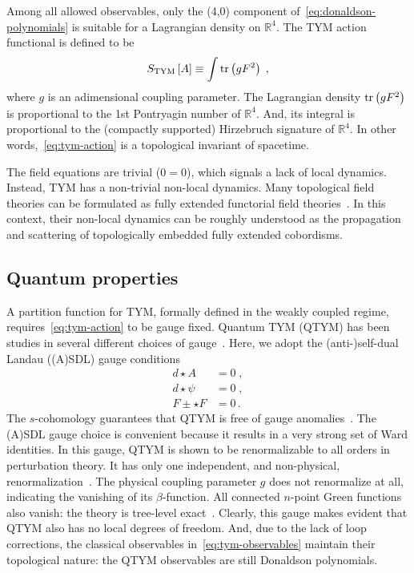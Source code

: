 \documentclass[../main/tex]{subfiles}
\begin{document}
Among all allowed observables, only the (4,0) component of~\eqref{eq:donaldson-polynomials} is suitable for a Lagrangian density on $ \mathbb{R}^4 $. The TYM action functional is defined to be
\begin{equation}\label{eq:tym-action}
  S_{\text{TYM}}\left[ A \right] \equiv  \int\operatorname{tr}\left( g F^2\right) \;,
\end{equation}
where $ g $ is an adimensional coupling parameter. The Lagrangian density $\operatorname{tr} \left(g F^2 \right)$ is proportional to the 1st Pontryagin number of $\mathbb{R}^4$. And, its integral is proportional to the (compactly supported) Hirzebruch signature of $\mathbb{R}^4$. In other words,~\eqref{eq:tym-action} is a topological  invariant of spacetime.

The field equations are trivial ($0=0$), which signals a lack of local dynamics. Instead, TYM has a non-trivial non-local dynamics. Many topological field theories can be formulated as fully extended functorial field theories~\cite{atiyah1988a,segal1988a,baez1995a,schreiber2009a,baez2009a}. In this context, their non-local dynamics can be roughly understood as the propagation and scattering of topologically embedded fully extended cobordisms.

\subsection{Quantum properties}\label{ssec:quantum-properties;sec:tym}

A partition function for TYM, formally defined in the weakly coupled regime, requires~\eqref{eq:tym-action} to be gauge fixed. Quantum TYM (QTYM) has been studies in several different choices of gauge~\cite{baulieu1988a,myers1990c,brandhuber1994a,piguet1995a,sadovski2017c,sadovski2018a,sadovski2018b}. Here, we adopt the (anti-)self-dual Landau ((A)SDL) gauge conditions
\begin{subequations}\label{eq:asdlg}
  \begin{align}
    d \star A     & = 0 \;, \\
    d \star \psi  & = 0 \;, \\
    F \pm \star F & = 0 \,.
  \end{align}
\end{subequations}
The $ s $-cohomology guarantees that QTYM is free of gauge anomalies~\cite{baulieu1988a}. The (A)SDL gauge choice is convenient because it results in a very strong set of Ward identities. In this gauge, QTYM is shown to be renormalizable to all orders in perturbation theory. It has only one independent, and non-physical, renormalization~\cite{sadovski2017c}. The physical coupling parameter $g$ does not renormalize at all, indicating the vanishing of its $\beta$-function. All connected $n$-point Green functions also vanish: the theory is tree-level exact~\cite{sadovski2018a}. Clearly, this gauge makes evident that QTYM also has no local degrees of freedom. And, due to the lack of loop corrections, the classical observables in~\eqref{eq:tym-observables} maintain their topological nature: the QTYM observables are still Donaldson polynomials.
\end{document}
